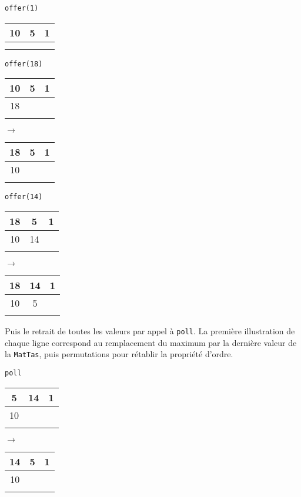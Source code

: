 \documentclass[iutinfo,10pt]{ustl-tdtp}
\begin{document}
\texttt{offer(1)}\\
\begin{tabular}{|c|c|c|}
\hline
    10 & 5 & 1 \\
\hline
     &  &  \\
\hline
     &  &  \\
\hline
\end{tabular}

\texttt{offer(18)}\\
\begin{tabular}{|c|c|c|}
\hline
    10 & 5 & 1 \\
\hline
    18 &  &  \\
\hline
     &  &  \\
\hline
\end{tabular}
$\rightarrow$
\begin{tabular}{|c|c|c|}
\hline
    18 & 5 & 1 \\
\hline
    10 &  &  \\
\hline
     &  &  \\
\hline
\end{tabular}

\texttt{offer(14)}\\
\begin{tabular}{|c|c|c|}
\hline
    18 & 5 & 1 \\
\hline
    10 & 14 &  \\
\hline
     &  &  \\
\hline
\end{tabular}
$\rightarrow$
\begin{tabular}{|c|c|c|}
\hline
    18 & 14 & 1 \\
\hline
    10 & 5 &  \\
\hline
     &  &  \\
\hline
\end{tabular}

Puis le retrait de toutes les valeurs par appel à \texttt{poll}. La première illustration de chaque ligne correspond au remplacement du maximum par la dernière valeur de la \texttt{MatTas}, puis permutations pour rétablir la propriété d'ordre.

\texttt{poll}\\
\begin{tabular}{|c|c|c|}
\hline
    5 & 14 & 1 \\
\hline
    10 &  &  \\
\hline
     &  &  \\
\hline
\end{tabular}
$\rightarrow$
\begin{tabular}{|c|c|c|}
\hline
    14 & 5 & 1 \\
\hline
    10 &  &  \\
\hline
     &  &  \\
\hline
\end{tabular}
\end{document}
